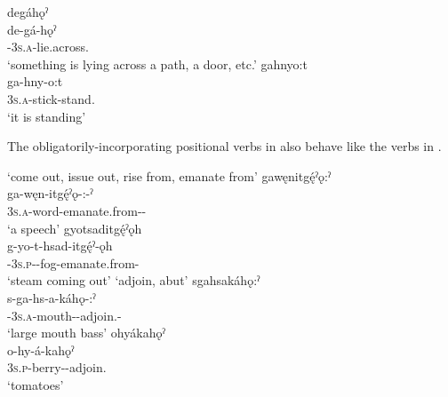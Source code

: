 \ex degáhǫˀ\\
\gll de-gá-hǫˀ\\
 {\dualic}-\textsc{3s.a}-lie.across.{\stative}\\
\glt `something is lying across a path, a door, etc.'
\ex gahnyo:t\\
\gll ga-hny-o:t\\
 \textsc{3s.a}-stick-stand.{\stative}\\
\glt `it is standing'
\z
\z

The obligatorily-incorporating positional verbs in  also behave like the verbs in .

\ea\label{ex:positppchoiceex18} 
\ea {} ‘come out, issue out, rise from, emanate from’
\ea 
gawęnitgę́ˀǫ:ˀ\\
	\gll ga-węn-itgę́ˀǫ-:-ˀ\\
	\textsc{3s.a}-word-emanate.from-{\nominalizer}-{\stative}\\
	\glt `a speech'
\ex gyotsaditgę́ˀǫh\\
	\gll g-yo-t-hsad-itgę́ˀ-ǫh\\
	{\cislocative}-\textsc{3s.p}-{\semireflexive}-fog-emanate.from-{\stative}\\
	\glt `steam coming out'
 \z 
\ex {} ‘adjoin, abut’
\ea sgahsakáhǫ:ˀ\\
	\gll s-ga-hs-a-káhǫ-:ˀ\\
	{\repetitive}-\textsc{3s.a}-mouth-{\joinerA}-adjoin.\stat-\nominalizer{}\\
	\glt `large mouth bass'
\ex ohyákahǫˀ\\
	\gll o-hy-á-kahǫˀ\\
	\textsc{3s.p}-berry-{\joinerA}-adjoin.{\stative}\\
	\glt `tomatoes'
\z
\z
\z 

